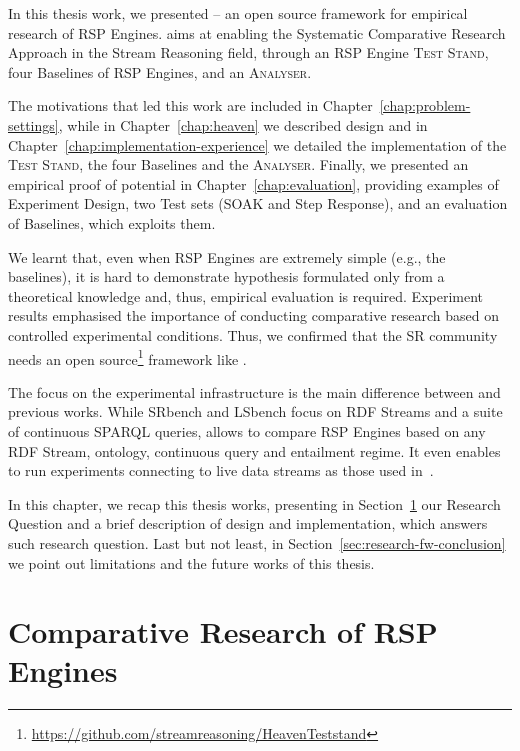 In this thesis work, we presented \name -- an open source framework for empirical research of RSP Engines. \name aims at enabling the Systematic Comparative Research Approach in the Stream Reasoning field, through an RSP Engine \textsc{Test Stand}, four Baselines of RSP Engines, and an \textsc{Analyser}. 

The motivations that led this work are included in Chapter~\ref{chap:problem-settings}, while in Chapter~\ref{chap:heaven} we described \name design and in Chapter~\ref{chap:implementation-experience} we detailed the implementation of the \textsc{Test Stand}, the four Baselines and the \textsc{Analyser}. Finally, we presented an empirical proof of \name potential in Chapter~\ref{chap:evaluation}, providing examples of Experiment Design, two Test sets (SOAK and Step Response), and an evaluation of \name Baselines, which exploits them.

We learnt that, even when RSP Engines are extremely simple (e.g., the baselines), it is hard to demonstrate hypothesis formulated only from a theoretical knowledge and, thus, empirical evaluation is required. Experiment results emphasised the importance of conducting comparative research based on controlled experimental conditions. Thus, we confirmed that the SR community needs an open source\footnote{\url{https://github.com/streamreasoning/HeavenTeststand}} framework like \namens.

The focus on the experimental infrastructure is the main difference between \name and previous works. While SRbench and LSbench focus on RDF Streams and a suite of continuous SPARQL queries, \name allows to compare RSP Engines based on any RDF Stream, ontology, continuous query and entailment regime. It even enables to run experiments connecting to live data streams as those used in~\cite{DBLP:conf/semweb/BalduiniVDTPC13}.	

In this chapter, we recap this thesis works, presenting in Section~\ref{sec:research-question-conclusion} our Research Question and a brief description of \name design and implementation, which answers such research question. Last but not least, in Section~\ref{sec:research-fw-conclusion} we point out \name limitations and the future works of this thesis.

\section{Comparative Research of RSP Engines}\label{sec:research-question-conclusion}

